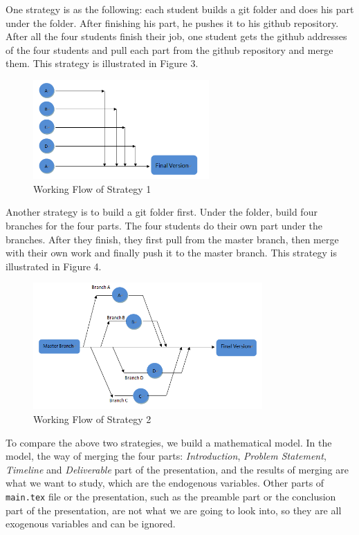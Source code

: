 \documentclass[12pt]{article}
\begin{document}
One strategy is as the following: each student builds a git folder and does his part under the folder. After finishing his part, he pushes it to his github repository. After all the four students finish their job, one student gets the github addresses of the four students and pull each part from the github repository and merge them. This strategy is illustrated in Figure 3.\\
\begin{figure}[!htb]
    \begin{center}
        \includegraphics[width=0.6\textwidth]{1.png}
    \end{center}
    \caption{Working Flow of Strategy 1}
\end{figure}

Another strategy is to build a git folder first. Under the folder, build four branches for the four parts. The four students do their own part under the branches. After they finish, they first pull from the master branch, then merge with their own work and finally push it to the master branch. This strategy is illustrated in Figure 4.\\
\begin{figure}[!htb]
    \begin{center}
        \includegraphics[width=0.78\textwidth]{2.png}
    \end{center}
    \caption{Working Flow of Strategy 2}
\end{figure}

To compare the above two strategies, we build a mathematical model. In the model, the way of merging the four parts: \emph{Introduction}, \emph{Problem Statement}, \emph{Timeline} and \emph{Deliverable} part of the presentation, and the results of merging are what we want to study, which are the endogenous variables. Other parts of \texttt{main.tex} file or the presentation, such as the preamble part or the conclusion part of the presentation, are not what we are going to look into, so they are all exogenous variables and can be ignored.\\
\end{document}
